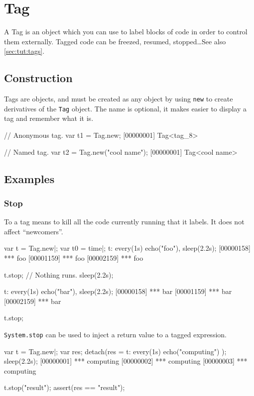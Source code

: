 \section{Tag}

A Tag is an object which you can use to label blocks of code in order
to control them externally.  Tagged code can be freezed, resumed,
stopped\ldots See also \autoref{sec:tut:tags}.

\subsection{Construction}
\label{stdlib:tag:ctor}

Tags are objects, and must be created as any object by using
\lstinline{new} to create derivatives of the \lstinline{Tag} object.
The name is optional, it makes easier to display a tag and remember
what it is.

\begin{urbiscript}
// Anonymous tag.
var t1 = Tag.new;
[00000001] Tag<tag_8>

// Named tag.
var t2 = Tag.new("cool name");
[00000001] Tag<cool name>
\end{urbiscript}

\subsection{Examples}

\subsubsection{Stop}
\label{sec:specs:tag:stop}

To  a tag means to kill all the code currently running that
it labels.  It does not affect ``newcomers''.

\begin{urbiscript}
var t = Tag.new|;
var t0 = time|;
t: every(1s) echo("foo"),
sleep(2.2s);
[00000158] *** foo
[00001159] *** foo
[00002159] *** foo

t.stop;
// Nothing runs.
sleep(2.2s);

t: every(1s) echo("bar"),
sleep(2.2s);
[00000158] *** bar
[00001159] *** bar
[00002159] *** bar

t.stop;
\end{urbiscript}

\lstinline|System.stop| can be used to inject a return value to a
tagged expression.

\begin{urbiscript}
var t = Tag.new|;
var res;
detach(res = { t: every(1s) echo("computing") });
sleep(2.2s);
[00000001] *** computing
[00000002] *** computing
[00000003] *** computing

t.stop("result");
assert(res == "result");
\end{urbiscript}

